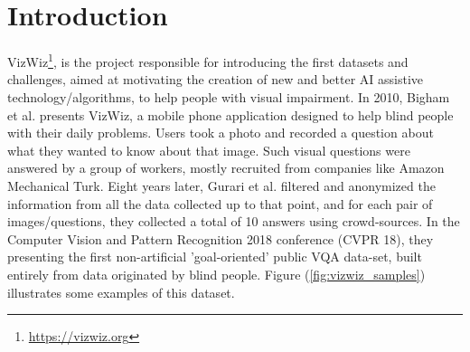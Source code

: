 \section{Introduction}
VizWiz\footnote {\url{https://vizwiz.org}}, is the project responsible for introducing the first datasets and challenges, aimed at motivating the creation of new and better AI assistive technology/algorithms, to help people with visual impairment.
In 2010, Bigham et al. \cite{vizwiz_phone} presents VizWiz, a mobile phone application designed to help blind people with their daily problems. Users took a photo and recorded a question about what they wanted to know about that image. Such visual questions were answered by a group of workers, mostly recruited from companies like Amazon Mechanical Turk.
Eight years later, Gurari et al. \cite{vizwiz_grandchallenge} filtered and anonymized the information from all the data collected up to that point, and for each pair of images/questions, they collected a total of 10 answers using crowd-sources. In the Computer Vision and Pattern Recognition 2018 conference (CVPR 18), they presenting the first non-artificial 'goal-oriented' public VQA data-set, built entirely from data originated by blind people. Figure (\ref{fig:vizwiz_samples}) illustrates some examples of this dataset.

